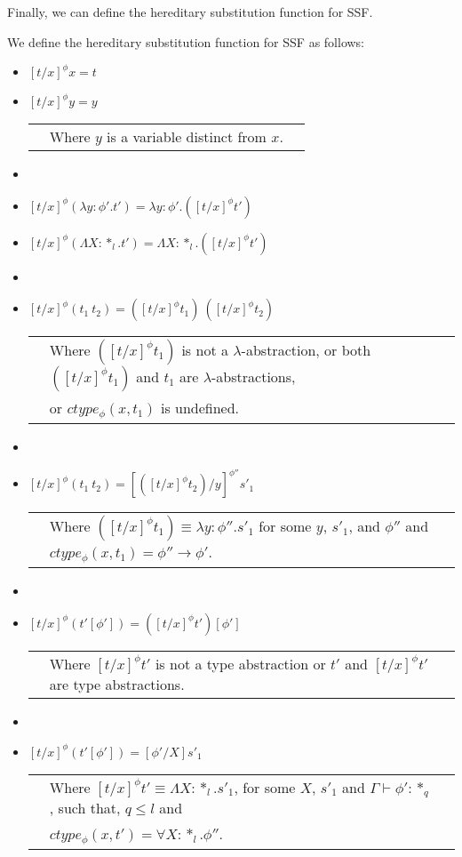 \noindent
Finally, we can define the hereditary substitution function for SSF.
\begin{definition}
  \label{def:hereditary_substitution_ssf}
  We define the hereditary substitution function for SSF as follows:
  \begin{itemize}
  \item[] $[t/x]^\phi x = t$
  \item[] $[t/x]^\phi y = y$\\
    \begin{tabular}{lll}
      & Where $y$ is a variable distinct from $x$.\\
    \end{tabular}
  \item[]
  \item[] $[t/x]^\phi (\lambda y:\phi'.t') = \lambda y:\phi'.([t/x]^\phi t')$
  \item[] $[t/x]^\phi (\Lambda X:*_l.t') = \Lambda X:*_l.([t/x]^\phi t')$
  \item[]
  \item[] $[t/x]^\phi (t_1\ t_2) = ([t/x]^\phi t_1)\ ([t/x]^\phi t_2)$\\
    \begin{tabular}{lll}
      & Where $([t/x]^\phi t_1)$ is not a $\lambda$-abstraction, or 
      both $([t/x]^\phi t_1)$ and $t_1$ are $\lambda$-abstractions, \\
      & or $ctype_\phi(x,t_1)$ is undefined.
    \end{tabular}
  \item[]
  \item[] $[t/x]^{\phi} (t_1\ t_2) = [([t/x]^{\phi} t_2)/y]^{\phi''} s'_1$\\
    \begin{tabular}{lll}
      & Where $([t/x]^{\phi} t_1) \equiv \lambda y:\phi''.s'_1$ 
      for some $y$, $s'_1$, and $\phi''$ and $ctype_\phi(x,t_1) = \phi'' \to \phi'$.
    \end{tabular}
  \item[] 
  \item[] $[t/x]^\phi (t'[\phi']) = ([t/x]^\phi t')[\phi']$\\
    \begin{tabular}{lll}
      & Where $[t/x]^\phi t'$ is not a type abstraction or
      $t'$ and $[t/x]^\phi t'$ are type abstractions.
    \end{tabular}
    \item[]
    \item[] $[t/x]^{\phi} (t'[\phi']) = [\phi'/X]s'_1$\\
      \begin{tabular}{lll}
        & Where $[t/x]^{\phi} t' \equiv \Lambda X:*_l.s'_1$,
        for some $X$, $s'_1$ and $\Gamma \vdash \phi':*_q$, 
        such that, $q \leq l$ and \\
        & $ctype_\phi(x,t') = \forall X:*_l.\phi''$.
      \end{tabular}
  \end{itemize}
\end{definition}

